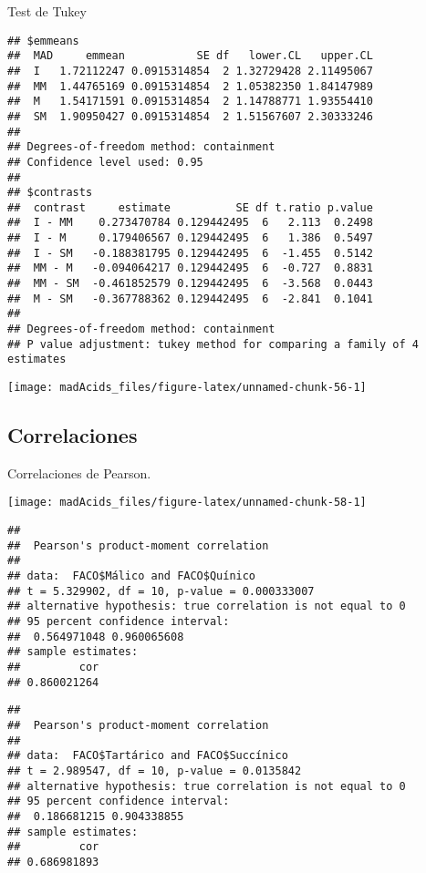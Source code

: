 \documentclass[
]{article}
\begin{document}
Test de Tukey

\begin{verbatim}
## $emmeans
##  MAD     emmean           SE df   lower.CL   upper.CL
##  I   1.72112247 0.0915314854  2 1.32729428 2.11495067
##  MM  1.44765169 0.0915314854  2 1.05382350 1.84147989
##  M   1.54171591 0.0915314854  2 1.14788771 1.93554410
##  SM  1.90950427 0.0915314854  2 1.51567607 2.30333246
## 
## Degrees-of-freedom method: containment 
## Confidence level used: 0.95 
## 
## $contrasts
##  contrast     estimate          SE df t.ratio p.value
##  I - MM    0.273470784 0.129442495  6   2.113  0.2498
##  I - M     0.179406567 0.129442495  6   1.386  0.5497
##  I - SM   -0.188381795 0.129442495  6  -1.455  0.5142
##  MM - M   -0.094064217 0.129442495  6  -0.727  0.8831
##  MM - SM  -0.461852579 0.129442495  6  -3.568  0.0443
##  M - SM   -0.367788362 0.129442495  6  -2.841  0.1041
## 
## Degrees-of-freedom method: containment 
## P value adjustment: tukey method for comparing a family of 4 estimates
\end{verbatim}

\begin{center}\texttt{[image: madAcids\_files/figure-latex/unnamed-chunk-56-1]} \end{center}

\subsection{Correlaciones}\label{correlaciones}

Correlaciones de Pearson.

\begin{center}\texttt{[image: madAcids\_files/figure-latex/unnamed-chunk-58-1]} \end{center}

\begin{verbatim}
## 
##  Pearson's product-moment correlation
## 
## data:  FACO$Málico and FACO$Quínico
## t = 5.329902, df = 10, p-value = 0.000333007
## alternative hypothesis: true correlation is not equal to 0
## 95 percent confidence interval:
##  0.564971048 0.960065608
## sample estimates:
##         cor 
## 0.860021264
\end{verbatim}

\begin{verbatim}
## 
##  Pearson's product-moment correlation
## 
## data:  FACO$Tartárico and FACO$Succínico
## t = 2.989547, df = 10, p-value = 0.0135842
## alternative hypothesis: true correlation is not equal to 0
## 95 percent confidence interval:
##  0.186681215 0.904338855
## sample estimates:
##         cor 
## 0.686981893
\end{verbatim}
\end{document}
